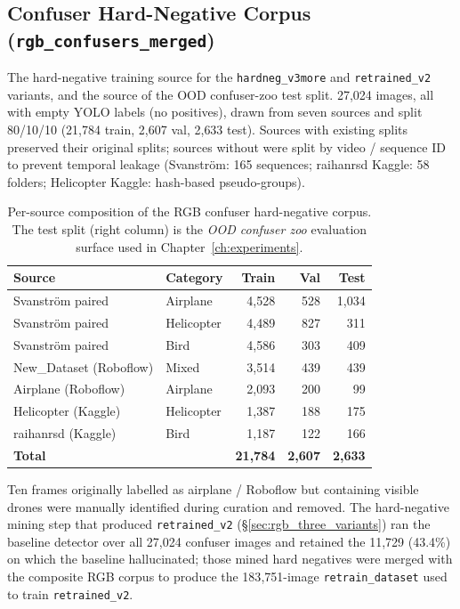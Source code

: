 \documentclass[12pt,a4paper,oneside,openright]{book}
\begin{document}
\subsection{Confuser Hard-Negative Corpus (\texttt{rgb\_confusers\_merged})}
\label{sec:ds_confusers}

The hard-negative training source for the \texttt{hardneg\_v3more} and \texttt{retrained\_v2} variants, and the source of the OOD confuser-zoo test split. 27{,}024 images, all with empty YOLO labels (no positives), drawn from seven sources and split 80/10/10 (21{,}784 train, 2{,}607 val, 2{,}633 test). Sources with existing splits preserved their original splits; sources without were split by video / sequence ID to prevent temporal leakage (Svanstr\"om: 165 sequences; raihanrsd Kaggle: 58 folders; Helicopter Kaggle: hash-based pseudo-groups).

\begin{table}[htbp]
    \centering
    \caption{Per-source composition of the RGB confuser hard-negative corpus. The test split (right column) is the \emph{OOD confuser zoo} evaluation surface used in Chapter~\ref{ch:experiments}.}
    \label{tab:ds_confusers}
    \begin{tabular}{llrrr}
        \toprule
        Source & Category & Train & Val & Test \\
        \midrule
        Svanstr\"om paired & Airplane    & 4{,}528 &   528 & 1{,}034 \\
        Svanstr\"om paired & Helicopter  & 4{,}489 &   827 &    311 \\
        Svanstr\"om paired & Bird        & 4{,}586 &   303 &    409 \\
        New\_Dataset (Roboflow) & Mixed  & 3{,}514 &   439 &    439 \\
        Airplane (Roboflow) & Airplane   & 2{,}093 &   200 &     99 \\
        Helicopter (Kaggle) & Helicopter & 1{,}387 &   188 &    175 \\
        raihanrsd (Kaggle) & Bird        & 1{,}187 &   122 &    166 \\
        \midrule
        \textbf{Total}     &             & \textbf{21{,}784} & \textbf{2{,}607} & \textbf{2{,}633} \\
        \bottomrule
    \end{tabular}
\end{table}

Ten frames originally labelled as airplane / Roboflow but containing visible drones were manually identified during curation and removed. The hard-negative mining step that produced \texttt{retrained\_v2} (\S\ref{sec:rgb_three_variants}) ran the baseline detector over all 27{,}024 confuser images and retained the 11{,}729 (43.4\%) on which the baseline hallucinated; those mined hard negatives were merged with the composite RGB corpus to produce the 183{,}751-image \texttt{retrain\_dataset} used to train \texttt{retrained\_v2}.
\end{document}

